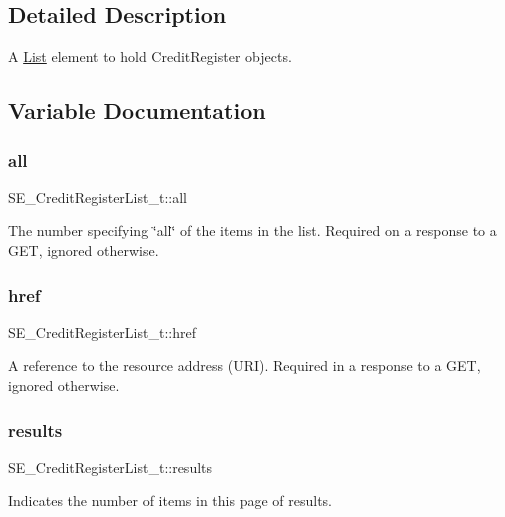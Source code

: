 \subsection{Detailed Description}
A \hyperlink{structList}{List} element to hold Credit\+Register objects. 

\subsection{Variable Documentation}
\mbox{\label{group__CreditRegisterList_gab1223b63def7d1d4811bc32c4addf18d}} 
\subsubsection{\texorpdfstring{all}{all}}
{\footnotesize\ttfamily S\+E\+\_\+\+Credit\+Register\+List\+\_\+t\+::all}

The number specifying \char`\"{}all\char`\"{} of the items in the list. Required on a response to a G\+ET, ignored otherwise. \mbox{\label{group__CreditRegisterList_gabc831c1d07e49cfadf9af91ea5ebf19d}} 
\subsubsection{\texorpdfstring{href}{href}}
{\footnotesize\ttfamily S\+E\+\_\+\+Credit\+Register\+List\+\_\+t\+::href}

A reference to the resource address (U\+RI). Required in a response to a G\+ET, ignored otherwise. \mbox{\label{group__CreditRegisterList_ga4ca66cecce8ebdd10c6e4fc24350ad3c}} 
\subsubsection{\texorpdfstring{results}{results}}
{\footnotesize\ttfamily S\+E\+\_\+\+Credit\+Register\+List\+\_\+t\+::results}

Indicates the number of items in this page of results. 